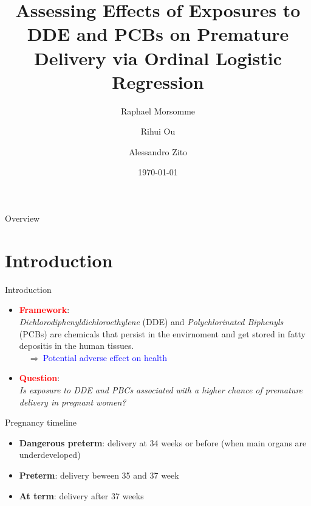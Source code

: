 \documentclass{beamer}\usepackage[]{graphicx}\usepackage[]{color}
\title[DDE and PCB effect on Premature delivery]{Assessing Effects of Exposures to DDE and PCBs on Premature Delivery via Ordinal Logistic Regression}
\author[Morsomme, Ou, Zito]{Raphael Morsomme \and Rihui Ou \and Alessandro Zito}
\institute[Stat 723]{Case Study 1 - Stat 723}
\date{\today}
\begin{document}
\begin{frame}
\titlepage
\end{frame}

\begin{frame}{Overview}
\tableofcontents
\end{frame}

\section{Introduction}
\begin{frame}{Introduction}
\begin{itemize}
\item \textcolor{red}{\textbf{Framework}}: \\
\textit{Dichlorodiphenyldichloroethylene} (DDE) and \textit{Polychlorinated Biphenyls} (PCBs) 
are chemicals that persist in the envirnoment and get stored in fatty depositis in the human tissues.\\
$\quad \Longrightarrow \ $\textcolor{blue}{Potential adverse effect on health}
\item \textcolor{red}{\textbf{Question}}:\\
\textit{Is exposure to DDE and PBCs associated with a higher chance of premature delivery in pregnant women?}
\end{itemize}
\begin{block}{Pregnancy timeline}
\begin{itemize}
\item \textbf{Dangerous preterm}:  delivery at 34 weeks or before (when main organs are underdeveloped)
\item \textbf{Preterm}: delivery beween 35 and 37 week
\item \textbf{At term}: delivery after 37 weeks
\end{itemize}
\end{block}
\end{frame}

\end{document}
